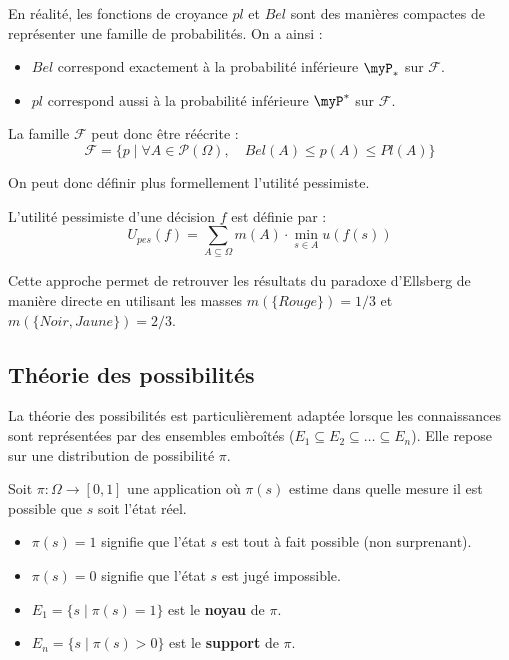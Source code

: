 \begin{proposition}
    En réalité, les fonctions de croyance $pl$ et $Bel$ sont des manières compactes de représenter 
    une famille de probabilités. On a ainsi : 
    \begin{itemize}
        \item $Bel$ correspond exactement à la probabilité inférieure $ \myP_*$ sur $ \mathcal{F}$. 
        \item $pl$ correspond aussi à la probabilité inférieure $ \myP^*$ sur $ \mathcal{F}$. 
    \end{itemize}
    La famille $ \mathcal{F}$ peut donc être réécrite : 
        $$ \mathcal{F} = \{p \mid \forall A \in \mathcal{P}( \Omega), \quad Bel(A) \leqslant p(A) \leqslant Pl(A)\} $$
\end{proposition}
 
On peut donc définir plus formellement l'utilité pessimiste. 

\begin{definition}
    L'utilité pessimiste d'une décision $f$ est définie par :
    \begin{equation}
        \boxed{ U_{pes}(f) = \sum_{A \subseteq \Omega} m(A) \cdot \min_{s \in A} u(f(s)) }
    \end{equation}
\end{definition}

\begin{remark}
    Cette approche permet de retrouver les résultats du paradoxe d'Ellsberg de manière directe en utilisant les masses $m(\{Rouge\}) = 1/3$ et $m(\{Noir, Jaune\}) = 2/3$.
\end{remark}

\subsection{Théorie des possibilités}

La théorie des possibilités est particulièrement adaptée lorsque les connaissances sont représentées par des ensembles 
emboîtés ($E_1 \subseteq E_2 \subseteq \dots \subseteq E_n$). Elle repose sur une distribution de
possibilité $\pi$.

\begin{definition}
    Soit $\pi : \Omega \longrightarrow [0,1]$ une application où $\pi(s)$ estime dans quelle mesure il est 
    possible que $s$ soit l'état réel.
    \begin{itemize}
        \item $\pi(s) = 1$ signifie que l'état $s$ est tout à fait possible (non surprenant).
        \item $\pi(s) = 0$ signifie que l'état $s$ est jugé impossible.
        \item $E_1 = \{s \mid \pi(s) = 1\}$ est le \textbf{noyau} de $\pi$.
        \item $E_n = \{s \mid \pi(s) > 0\}$ est le \textbf{support} de $\pi$.
    \end{itemize}
\end{definition}

